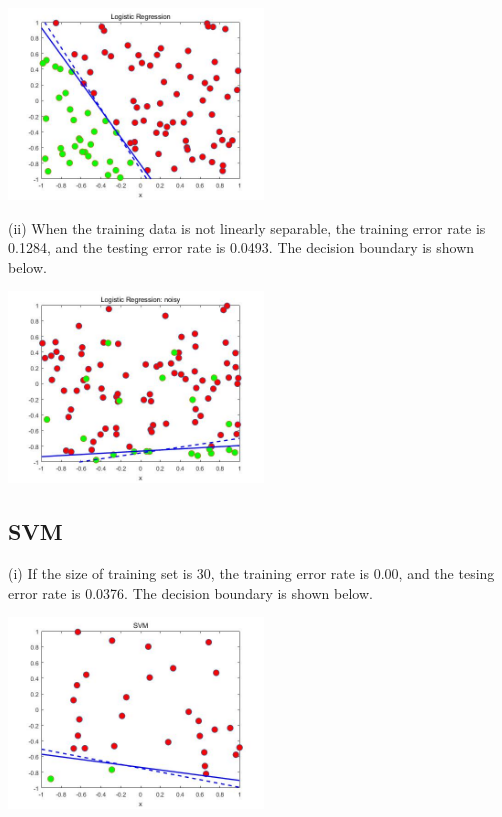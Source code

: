 \documentclass[11pt]{article} %
\begin{document}
\begin{center}
\includegraphics[height=2in]{./Logistic_i.jpg}
\end{center}

(ii) When the training data is not linearly separable, the training error rate is 0.1284, and the testing error rate is 0.0493. The decision boundary is shown below.

\begin{center}
\includegraphics[height=2in]{./Logistic_ii.jpg}
\end{center}


\subsection{SVM}

(i) If the size of training set is 30, the training error rate is 0.00, and the tesing error rate is 0.0376. The decision boundary is shown below.

\begin{center}
\includegraphics[height=2in]{./SVM_i.jpg}
\end{center}
 
\end{document}
